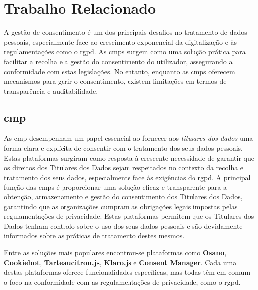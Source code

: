 \chapter{Trabalho Relacionado}

A gestão de consentimento é um dos principais desafios no tratamento de dados pessoais, especialmente face ao crescimento exponencial da digitalização e às regulamentações como o \acrshort{rgpd}. As \acrshort{cmp}s surgem como uma solução prática para facilitar a recolha e a gestão do consentimento do utilizador, assegurando a conformidade com estas legislações. No entanto, enquanto as \acrshort{cmp}s oferecem mecanismos para gerir o consentimento, existem limitações em termos de transparência e auditabilidade.


\section{\acrfull{cmp}}

As \acrfull{cmp} desempenham um papel essencial ao fornecer aos \textit{titulares dos dados} uma forma clara e explícita de consentir com o tratamento dos seus dados pessoais. Estas plataformas surgiram como resposta à crescente necessidade de garantir que os direitos dos Titulares dos Dados sejam respeitados no contexto da recolha e tratamento dos seus dados, especialmente face às exigências do \acrshort{rgpd}. A principal função das \acrshort{cmp}s é proporcionar uma solução eficaz e transparente para a obtenção, armazenamento e gestão do consentimento dos Titulares dos Dados, garantindo que as organizações cumpram as obrigações legais impostas pelas regulamentações de privacidade. Estas plataformas permitem que os Titulares dos Dados tenham controlo sobre o uso dos seus dados pessoais e são devidamente informados sobre as práticas de tratamento destes mesmos.

Entre as soluções mais populares encontrou-se plataformas como \textbf{Osano}, \textbf{Cookiebot}, \textbf{Tarteaucitron.js}, \textbf{Klaro.js} e \textbf{Consent Manager}. Cada uma destas plataformas oferece funcionalidades específicas, mas todas têm em comum o foco na conformidade com as regulamentações de privacidade, como o \acrshort{rgpd}.

